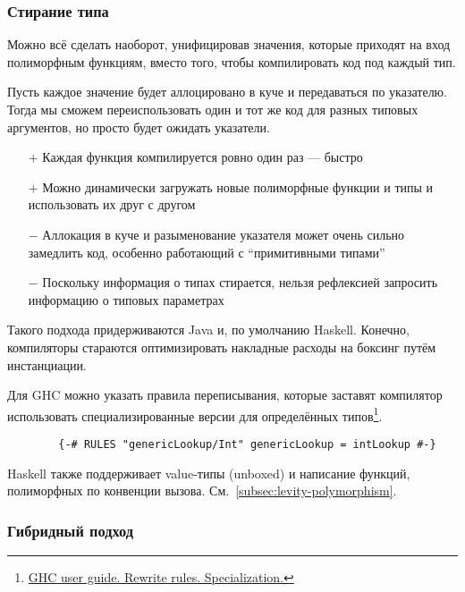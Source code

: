 \documentclass[12pt]{article}
\newcommand{\positive}{$+$} %
\newcommand{\negative}{{\color{red} $-$}} %
\begin{document}
    \subsubsection{Стирание типа} \label{subsubsec:type-erasure}

    Можно всё сделать наоборот, унифицировав значения, которые приходят на вход полиморфным функциям, вместо того, чтобы компилировать код под каждый тип.

    Пусть каждое значение будет аллоцировано в куче и передаваться по указателю.
    Тогда мы сможем переиспользовать один и тот же код для разных типовых аргументов, но просто будет ожидать указатели.

    \begin{itemize}
        \item[\positive] Каждая функция компилируется ровно один раз --- быстро
        \item[\positive] Можно динамически загружать новые полиморфные функции и типы и использовать их друг с другом
        \item[\negative] Аллокация в куче и разыменование указателя может очень сильно замедлить код, особенно работающий с ``примитивными типами''
        \item[\negative] Поскольку информация о типах стирается, нельзя рефлексией запросить информацию о типовых параметрах
    \end{itemize}

    Такого подхода придерживаются Java и, по умолчанию Haskell.
    Конечно, компиляторы стараются оптимизировать накладные расходы на боксинг путём инстанциации.

    Для GHC можно указать правила переписывания, которые заставят компилятор использовать специализированные версии для определённых типов\footnote{\href{https://downloads.haskell.org/~ghc/6.12.2/docs/html/users\_guide/rewrite-rules.html\#rule-spec}{GHC user guide. Rewrite rules. Specialization.}}.
    \begin{verbatim}
        {-# RULES "genericLookup/Int" genericLookup = intLookup #-}
    \end{verbatim}

    Haskell также поддерживает value-типы (unboxed) и написание функций, полиморфных по конвенции вызова.
    См.~\ref{subsec:levity-polymorphism}.


    \subsubsection{Гибридный подход}
\end{document}
